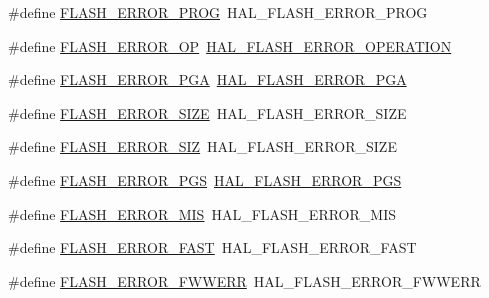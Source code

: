 \begin{DoxyCompactItemize}
\item 
\#define \hyperlink{group___h_a_l___f_l_a_s_h___aliased___defines_ga737128e267cde11757448a999b907a7c}{F\+L\+A\+S\+H\+\_\+\+E\+R\+R\+O\+R\+\_\+\+P\+R\+OG}~H\+A\+L\+\_\+\+F\+L\+A\+S\+H\+\_\+\+E\+R\+R\+O\+R\+\_\+\+P\+R\+OG
\item 
\#define \hyperlink{group___h_a_l___f_l_a_s_h___aliased___defines_ga7e6bf51847569d433bdb694bdb5ac0f7}{F\+L\+A\+S\+H\+\_\+\+E\+R\+R\+O\+R\+\_\+\+OP}~\hyperlink{group___f_l_a_s_h___error___code_gafa1433e0ca2366478928c04244310d44}{H\+A\+L\+\_\+\+F\+L\+A\+S\+H\+\_\+\+E\+R\+R\+O\+R\+\_\+\+O\+P\+E\+R\+A\+T\+I\+ON}
\item 
\#define \hyperlink{group___h_a_l___f_l_a_s_h___aliased___defines_ga3e610cf7bc499ea0e7eee1380a04f42d}{F\+L\+A\+S\+H\+\_\+\+E\+R\+R\+O\+R\+\_\+\+P\+GA}~\hyperlink{group___f_l_a_s_h___error___code_gad9f62b6567543610f667bce580550662}{H\+A\+L\+\_\+\+F\+L\+A\+S\+H\+\_\+\+E\+R\+R\+O\+R\+\_\+\+P\+GA}
\item 
\#define \hyperlink{group___h_a_l___f_l_a_s_h___aliased___defines_gac056ad0617d3beaf8cf2ffb0c87b7266}{F\+L\+A\+S\+H\+\_\+\+E\+R\+R\+O\+R\+\_\+\+S\+I\+ZE}~H\+A\+L\+\_\+\+F\+L\+A\+S\+H\+\_\+\+E\+R\+R\+O\+R\+\_\+\+S\+I\+ZE
\item 
\#define \hyperlink{group___h_a_l___f_l_a_s_h___aliased___defines_gaaa959c347779d59952fcb60d15dbe2b0}{F\+L\+A\+S\+H\+\_\+\+E\+R\+R\+O\+R\+\_\+\+S\+IZ}~H\+A\+L\+\_\+\+F\+L\+A\+S\+H\+\_\+\+E\+R\+R\+O\+R\+\_\+\+S\+I\+ZE
\item 
\#define \hyperlink{group___h_a_l___f_l_a_s_h___aliased___defines_ga578b6dd558f1d11d9791b3c63a61e14b}{F\+L\+A\+S\+H\+\_\+\+E\+R\+R\+O\+R\+\_\+\+P\+GS}~\hyperlink{group___f_l_a_s_h___error___code_ga7132ff3b7f45c0cfe818d61bdb01dc64}{H\+A\+L\+\_\+\+F\+L\+A\+S\+H\+\_\+\+E\+R\+R\+O\+R\+\_\+\+P\+GS}
\item 
\#define \hyperlink{group___h_a_l___f_l_a_s_h___aliased___defines_ga10229d78c25e0d944031910606462be1}{F\+L\+A\+S\+H\+\_\+\+E\+R\+R\+O\+R\+\_\+\+M\+IS}~H\+A\+L\+\_\+\+F\+L\+A\+S\+H\+\_\+\+E\+R\+R\+O\+R\+\_\+\+M\+IS
\item 
\#define \hyperlink{group___h_a_l___f_l_a_s_h___aliased___defines_gad20c28b002e14116facba21f02b0d1ba}{F\+L\+A\+S\+H\+\_\+\+E\+R\+R\+O\+R\+\_\+\+F\+A\+ST}~H\+A\+L\+\_\+\+F\+L\+A\+S\+H\+\_\+\+E\+R\+R\+O\+R\+\_\+\+F\+A\+ST
\item 
\#define \hyperlink{group___h_a_l___f_l_a_s_h___aliased___defines_ga9386eae0fe9e5b47720ad2378d27e743}{F\+L\+A\+S\+H\+\_\+\+E\+R\+R\+O\+R\+\_\+\+F\+W\+W\+E\+RR}~H\+A\+L\+\_\+\+F\+L\+A\+S\+H\+\_\+\+E\+R\+R\+O\+R\+\_\+\+F\+W\+W\+E\+RR

\end{DoxyCompactItemize}

